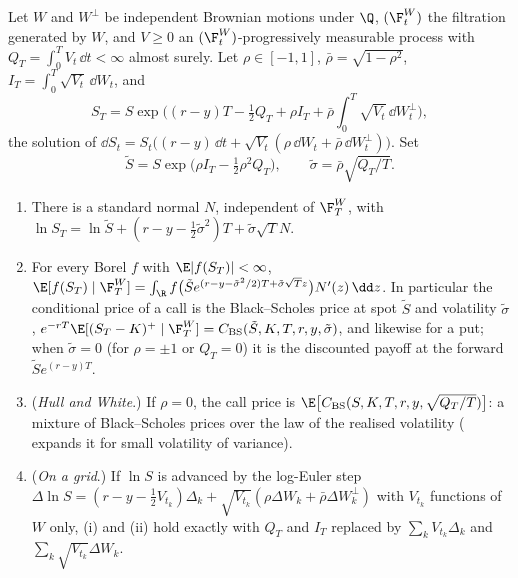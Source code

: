 \begin{proposition}\label{prop:st-mixing}
Let $W$ and $W^\perp$ be independent Brownian motions under $\Q$, $(\F^W_t)$ the
filtration generated by $W$, and $V\ge0$ an $(\F^W_t)$-progressively measurable process
with $Q_T=\int_0^TV_t\,\dd t<\infty$ almost surely. Let $\rho\in[-1,1]$, $\bar\rho=\sqrt{1-\rho^2}$,
$I_T=\int_0^T\sqrt{V_t}\,\dd W_t$, and
\[
  S_T=S\exp\Big((r-y)T-\tfrac12Q_T+\rho I_T+\bar\rho\int_0^T\sqrt{V_t}\,\dd W^\perp_t\Big),
\]
the solution of $\dd S_t=S_t\big((r-y)\,\dd t+\sqrt{V_t}(\rho\,\dd W_t+\bar\rho\,\dd W^\perp_t)\big)$. Set
\[
  \tilde S=S\exp\big(\rho I_T-\tfrac12\rho^2Q_T\big),\qquad \tilde\sigma=\bar\rho\sqrt{Q_T/T}.
\]
\begin{enumerate}[label=(\roman*)]
  \item There is a standard normal $N$, independent of $\F^W_T$, with
    $\ln S_T=\ln\tilde S+(r-y-\frac12\tilde\sigma^2)T+\tilde\sigma\sqrt TN$.
  \item For every Borel $f$ with $\E|f(S_T)|<\infty$,
    $\E[f(S_T)\mid\F^W_T]=\int_\R f\big(\tilde Se^{(r-y-\tilde\sigma^2/2)T+\tilde\sigma\sqrt Tz}\big)N'(z)\,\dd z$.
    In particular the conditional price of a call is the Black--Scholes price at spot
    $\tilde S$ and volatility $\tilde\sigma$, $e^{-rT}\E[(S_T-K)^+\mid\F^W_T]=C_{\mathrm{BS}}(\tilde S,K,T,r,y,\tilde\sigma)$,
    and likewise for a put; when $\tilde\sigma=0$ (for $\rho=\pm1$ or $Q_T=0$) it is the
    discounted payoff at the forward $\tilde Se^{(r-y)T}$.
  \item (\emph{Hull and White}.) If $\rho=0$, the call price is
    $\E\big[C_{\mathrm{BS}}(S,K,T,r,y,\sqrt{Q_T/T})\big]$: a mixture of Black--Scholes prices
    over the law of the realised volatility ( expands it for small
    volatility of variance).
  \item (\emph{On a grid}.) If $\ln S$ is advanced by the log-Euler step
    $\Delta\ln S=(r-y-\frac12V_{t_k})\Delta_k+\sqrt{V_{t_k}}(\rho\Delta W_k+\bar\rho\Delta W^\perp_k)$
    with $V_{t_k}$ functions of $W$ only, (i) and (ii) hold exactly with $Q_T$ and $I_T$ replaced
    by $\sum_kV_{t_k}\Delta_k$ and $\sum_k\sqrt{V_{t_k}}\Delta W_k$.
\end{enumerate}
\end{proposition}

